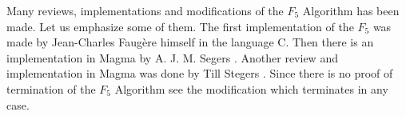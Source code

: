 Many reviews, implementations and modifications of the $F_5$ Algorithm has been made. Let us emphasize some of them. The first implementation of the $F_5$ was made by Jean-Charles Faug\`ere himself in the language C. Then there is an implementation in Magma by A. J. M. Segers \cite{Segers}. Another review and implementation in Magma was done by Till Stegers \cite{Stegers}. Since there is no proof of termination of the $F_5$ Algorithm see the modification \cite{ModifyingF5} which terminates in any case. 
